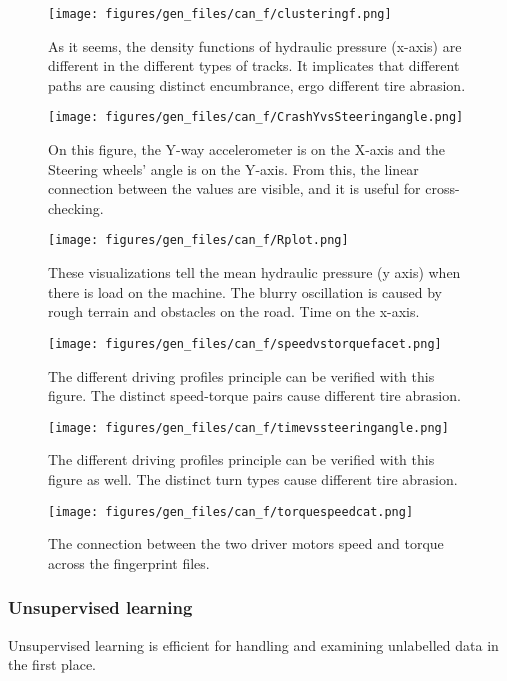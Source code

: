 		\begin{figure}[H]
			\centering
			\texttt{[image: figures/gen\_files/can\_f/clusteringf.png]}
			\caption{As it seems, the density functions of hydraulic pressure (x-axis) are different in the different types of tracks. It implicates that different paths are causing distinct encumbrance, ergo different tire abrasion.} 
			\end{figure}
		\begin{figure}[H]
			\centering
			\texttt{[image: figures/gen\_files/can\_f/CrashYvsSteeringangle.png]}
			\caption{On this figure, the Y-way accelerometer is on the X-axis and the Steering wheels' angle is on the Y-axis. From this, the linear connection between the values are visible, and it is useful for cross-checking.} 
			\end{figure}
		\begin{figure}[H]
			\centering
			\texttt{[image: figures/gen\_files/can\_f/Rplot.png]}
			\caption{These visualizations tell the mean hydraulic pressure (y axis) when there is load on the machine. The blurry oscillation is caused by rough terrain and obstacles on the road. Time on the x-axis.} 
			\end{figure}		
		\begin{figure}[H]
			\centering
			\texttt{[image: figures/gen\_files/can\_f/speedvstorquefacet.png]}
			\caption{The different driving profiles principle can be verified with this figure. The distinct speed-torque pairs cause different tire abrasion.} 
			\end{figure}	
		\begin{figure}[H]
			\centering
			\texttt{[image: figures/gen\_files/can\_f/timevssteeringangle.png]}
			\caption{The different driving profiles principle can be verified with this figure as well. The distinct turn types cause different tire abrasion.} 
			\end{figure}	
		\begin{figure}[H]
			\centering
			\texttt{[image: figures/gen\_files/can\_f/torquespeedcat.png]}
			\caption{The connection between the two driver motors speed and torque across the fingerprint files.} 
			\end{figure}		
	\subsubsection{Unsupervised learning}
	Unsupervised learning is efficient for handling and examining unlabelled data in the first place.
	
